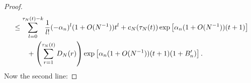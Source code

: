 \documentclass{article}
\newcommand{\1}[1]{\mathbbm{1}_{#1}}
\begin{document}
\begin{proof}
\begin{align}
&\leq \sum_{l=0}^{\tau_N(t) -k} \frac{1}{l!} (-\alpha_n)^l (1+O(N^{-1})) t^l
+ c_N(\tau_N(t)) \exp\left[ \alpha_n (1+O(N^{-1})) (t+1) \right] \notag\\
&\qquad+ \left( \sum_{r=1}^{\tau_N(t)} D_N(r) \right) \exp\left[ \alpha_n (1+O(N^{-1})) (t+1) (1+B_n^\prime) \right] %
 .
\end{align}
Now the second line:

\end{proof}
\end{document}
